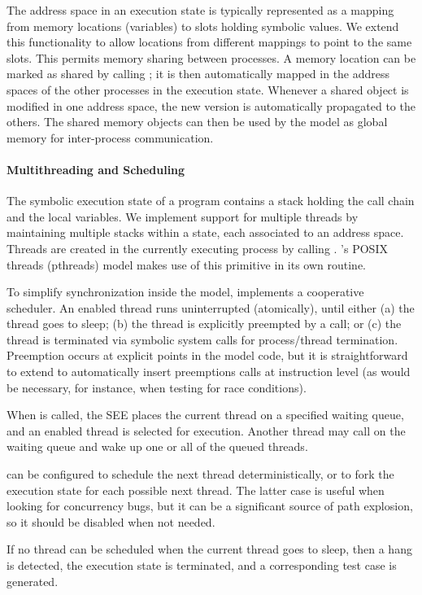 The address space in an execution state is typically represented as a mapping from memory locations (variables) to slots holding symbolic values.
%
We extend this functionality to allow locations from different mappings to point to the same slots.  This permits memory sharing between processes.
%
A memory location can be marked as shared by calling ; it is then automatically mapped in the address spaces of the other processes in the execution state.  Whenever a shared object is modified in one address space, the new version is automatically propagated to the others.  The shared memory objects can then be used by the model as global memory for inter-process communication.

\paragraph{Multithreading and Scheduling}

The symbolic execution state of a program contains a stack holding the call chain and the local variables.
%
We implement support for multiple threads by maintaining multiple stacks within a state, each associated to an address space.
%
Threads are created in the currently executing process by calling .  \cnine's POSIX threads (pthreads) model makes use of this primitive in its own  routine.

To simplify synchronization inside the model, \cnine implements a cooperative scheduler.
%
An enabled thread runs uninterrupted (atomically), until either (a) the thread goes to sleep; (b) the thread is explicitly preempted by a  call; or (c) the thread is terminated via symbolic system calls for process/thread termination. Preemption occurs at explicit points in the model code, but it is straightforward to extend \cnine to automatically insert preemptions calls at instruction level (as would be necessary, for instance, when testing for race conditions).

When  is called, the SEE places the current thread on a specified waiting queue, and an enabled thread is selected for execution.
%
Another thread may call  on the waiting queue and wake up one or all of the queued threads.

\cnine can be configured to schedule the next thread deterministically, or to fork the execution state for each possible next thread.
%
The latter case is useful when looking for concurrency bugs, but it can be a significant source of path explosion, so it should be disabled when not needed.

If no thread can be scheduled when the current thread goes to sleep, then a hang is detected, the execution state is terminated,  and a corresponding test case is generated.


